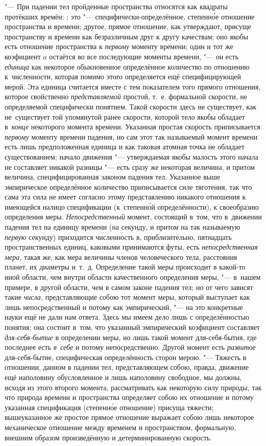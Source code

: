 "--- При падении тел пройденные пространства относятся как квадраты протёкших
времён: ; это "--- специфически-определённое, степенн\'{о}е отношение
пространства и времени; другое, прямое отношение, как утверждают, присуще
пространству и времени как безразличным друг к другу качествам; оно якобы есть
отношение пространства к {\em первому} моменту времени; один и тот же
коэфициент $a$ остаётся во все последующие моменты времени, "--- он есть
{\em единица} как некоторое обыкновенное определённое количество по отношению
к~численности, которая помимо этого определяется ещё специфицирующей мерой. Эта
единица считается вместе с тем показателем того прямого отношения, которое
свойственно {\em представляемой} простой, т.~е. формальной скорости, не
определяемой специфически понятием. Такой скорости здесь не существует, как
не~существует той упомянутой ранее скорости, которой тело якобы обладает
в~{\em конце} некоторого момента времени. Указанная простая скорость
приписывается {\em первому} моменту времени падения, но сам этот так называемый
момент времени есть лишь предположенная единица и как таковая атомная точка не
обладает существованием; начало движения "--- утверждаемая якобы малость этого
начала не составляет никакой разницы "--- есть сразу же некоторая величина, и
притом величина, специфицированная законом падения тел. Указанное выше
эмпирическое определённое количество приписывается силе тяготения, так что сама
эта сила не имеет согласно этому представлению никакого отношения к имеющейся
налицо спецификации (к~степенн\'{о}й определённости), к своеобразию определения
меры. {\em Непосредственный} момент, состоящий в~том, что в~движении падения
тел на единицу времени (на секунду, и притом на так называемую {\em первую}
секунду) приходится численность в, приблизительно, пятнадцать пространственных
единиц, каковыми принимаются футы, есть {\em непосредственная мера,} такая же,
как мера величины членов человеческого тела, расстояния планет, их диаметры
и~т.~д. Определение такой меры происходит в какой-то иной области, чем внутри
области качественного определения меры, "--- в~нашем примере, в другой области,
чем в самом законе падения тел; но от чего зависят такие {\em числа,}
представляющие собою тот момент меры, который выступает как лишь
непосредственный и потому как эмпирический, "--- на это конкретные науки ещё не
дали нам ответа. Здесь мы имеем дело лишь с определённостью понятия; она
состоит в~том, что указанный эмпирический коэфициент составляет
{\em для-себя-бытие} в определении меры, но лишь такой момент для-себя-бытия,
где последнее есть {\em в~себе} и потому непосредственно. Другой момент есть
{\em развитое} для-себя-бытие, специфическая определённость сторон мерою. "---
Тяжесть в отношении, данном в падении тел, представляющем собою, правда,
движение ещё наполовину обусловленное и лишь наполовину свободное, мы должны,
исходя из этого второго момента, рассматривать как некоторую силу природы, так
что природа времени и пространства определяет собою их отношение и потому
указанная спецификация (степенн\'{о}е отношение) присуща тяжести; вышеуказанное
же простое прямое отношение выражает собою лишь некоторое механическое
отношение между временем и пространством, формальную, внешним образом
произведённую и детерминированную скорость.


